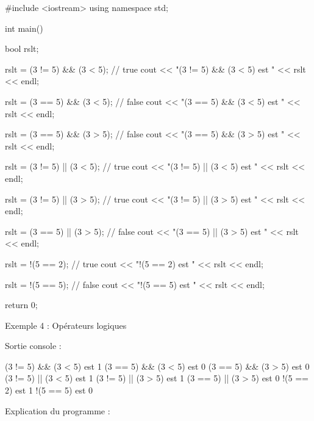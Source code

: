 \documentclass[10pt]{article}
\begin{document}
\begin{cppcode}
    #include <iostream>
    using namespace std;

    int main() {
        bool rslt;

        rslt = (3 != 5) && (3 < 5);     // true
        cout << "(3 != 5) && (3 < 5) est " << rslt << endl;

        rslt = (3 == 5) && (3 < 5);    // false
        cout << "(3 == 5) && (3 < 5) est " << rslt << endl;

        rslt = (3 == 5) && (3 > 5);    // false
        cout << "(3 == 5) && (3 > 5) est " << rslt << endl;

        rslt = (3 != 5) || (3 < 5);    // true
        cout << "(3 != 5) || (3 < 5) est " << rslt << endl;

        rslt = (3 != 5) || (3 > 5);    // true
        cout << "(3 != 5) || (3 > 5) est " << rslt << endl;

        rslt = (3 == 5) || (3 > 5);    // false
        cout << "(3 == 5) || (3 > 5) est " << rslt << endl;

        rslt = !(5 == 2);    // true
        cout << "!(5 == 2) est " << rslt << endl;

        rslt = !(5 == 5);    // false
        cout << "!(5 == 5) est " << rslt << endl;

        return 0;
    }
\end{cppcode}
\caption{Exemple 4 : Opérateurs logiques}

\bigskip
Sortie console :
\begin{textcode}
    (3 != 5) && (3 < 5) est 1
    (3 == 5) && (3 < 5) est 0
    (3 == 5) && (3 > 5) est 0
    (3 != 5) || (3 < 5) est 1
    (3 != 5) || (3 > 5) est 1
    (3 == 5) || (3 > 5) est 0
    !(5 == 2) est 1
    !(5 == 5) est 0
\end{textcode}

Explication du programme :
\end{document}
